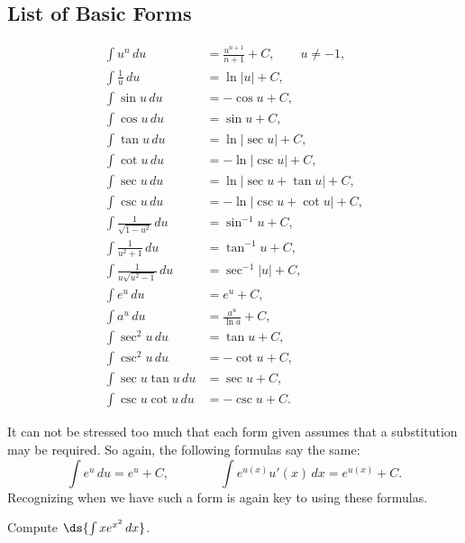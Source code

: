 \subsection{List of Basic Forms}

\begin{align}
\int u^n\,du&=\frac{u^{n+1}}{n+1}+C,\qquad u\ne-1,\label{IntPwrRlInU}\\
\int\frac1u\,du&=\ln|u|+C,\label{Int1/URl}\\
\int\sin u\,du&=-\cos u+C,\label{IntSinURl}\\
\int\cos u\,du&=\sin u+C,\label{IntCosURl}\\
\int\tan u\,du&=\ln|\sec u|+C,\label{IntTanURl}\\
\int\cot u\,du&=-\ln|\csc u|+C,\label{IntCotURl}\\
\int\sec u\,du&=\ln|\sec u+\tan u|+C,\label{IntSecURl}\\
\int\csc u\,du&=-\ln|\csc u+\cot u|+C,\label{IntCscURl}\\
\int\frac1{\sqrt{1-u^2}}\,du&=\sin^{-1}u+C,\label{IntGivingArcSinURl}\\
\int\frac1{u^2+1}\,du&=\tan^{-1}u+C,\label{IntGivingArcTanURl}\\
\int\frac1{u\sqrt{u^2-1}}\,du&=\sec^{-1}|u|+C,\label{IntGivingArcSec|U|Rl}\\
\int e^u\,du&=e^u+C,\label{IntGivingExp(U)Rl}\\
\int a^u\,du&=\frac{a^u}{\ln a}+C,\label{IntA^URl}\\
\int \sec^2u\,du&=\tan u+C,\label{IntSec^2URl}\\
\int\csc^2u\,du&=-\cot u+C,\label{IntCsc^2URl}\\
\int\sec u\tan u\,du&=\sec u+C,\label{IntSecUTanURl}\\
\int\csc u\cot u\,du&=-\csc u+C.\label{IntCscUCotURl}\end{align}


It can not be stressed too much that each form given assumes that
a substitution may be required.  So again, the following formulas
say the same:
$$\int e^u\,du=e^u+C,\qquad\qquad \int e^{u(x)}u'(x)\,dx=e^{u(x)}+C.$$
Recognizing when we have such a form is again key to using these formulas.

\bex Compute $\ds{\int x e^{x^2}\,dx}$.

